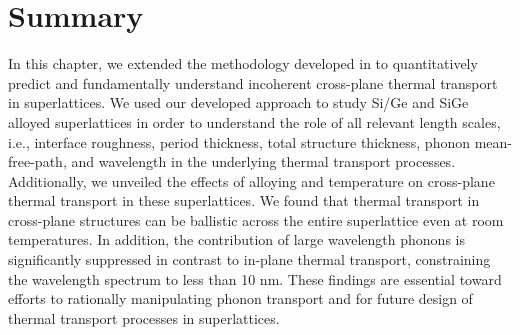 \section{Summary}
In this chapter, we extended the methodology developed in  to quantitatively predict and fundamentally understand incoherent cross-plane thermal transport in superlattices. We used our developed approach to study Si/Ge and SiGe alloyed superlattices in order to understand the role of all relevant length scales, i.e., interface roughness, period thickness, total structure thickness, phonon mean-free-path, and wavelength in the underlying thermal transport processes. Additionally, we unveiled the effects of alloying and temperature on cross-plane thermal transport in these superlattices. We found that thermal transport in cross-plane structures can be ballistic across the entire superlattice even at room temperatures. In addition, the contribution of large wavelength phonons is significantly suppressed in contrast to in-plane thermal transport, constraining the wavelength spectrum to less than 10 nm. These findings are essential toward efforts to rationally manipulating phonon transport and for future design of thermal transport processes in superlattices.


